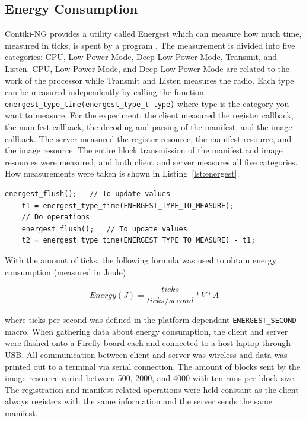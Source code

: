 \documentclass[0-thesis.tex]{subfiles}
\begin{document}
\subsection{Energy Consumption}
\label{ssec:energy-consumption}
Contiki-NG provides a utility called Energest which can measure how much time, measured in
ticks, is spent by a program \parencite{energest}. The measurement is divided into five
categories: CPU, Low Power Mode, Deep Low Power Mode, Transmit, and Listen. CPU, Low Power
Mode, and Deep Low Power Mode are related to the work of the processor while Transmit and
Listen measures the radio. Each type can be measured independently by calling the function
\texttt{energest\_type\_time(energest\_type\_t type)} where type is the category you want
to measure. For the experiment, the client measured the register callback, the manifest
callback, the decoding and parsing of the manifest, and the image callback. The server
measured the register resource, the manifest resource, and the image resource. The entire
block transmission of the manifest and image resources were measured, and both client and
server measures all five categories. How measurements were taken is shown in
Listing~\ref{lst:energest}.

\begin{lstlisting}[language=manifest, caption={How to measure ticks in energest.}, label=lst:energest]
    energest_flush();   // To update values
    t1 = energest_type_time(ENERGEST_TYPE_TO_MEASURE);
    // Do operations
    energest_flush();   // To update values
    t2 = energest_type_time(ENERGEST_TYPE_TO_MEASURE) - t1;
\end{lstlisting}

With the amount of ticks, the following formula was used to obtain energy consumption
(measured in Joule)

$$ Energy (J) = \frac{ticks}{ticks/second} * V * A $$

where ticks per second was defined in the platform dependant \texttt{ENERGEST\_SECOND}
macro. When gathering data about energy consumption, the client and server were flashed
onto a Firefly board each and connected to a host laptop through USB. All communication
between client and server was wireless and data was printed out to a terminal via serial
connection. The amount of blocks sent by the image resource varied between 500, 2000, and
4000 with ten runs per block size. The registration and manifest related operations were
held constant as the client always registers with the same information and the server
sends the same manifest. 
\end{document}
